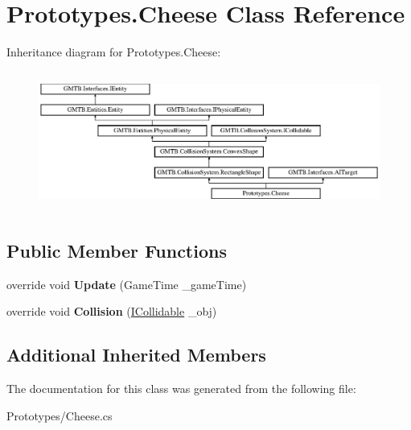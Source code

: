 \hypertarget{class_prototypes_1_1_cheese}{}\section{Prototypes.\+Cheese Class Reference}
\label{class_prototypes_1_1_cheese}
Inheritance diagram for Prototypes.\+Cheese\+:\begin{figure}[H]
\begin{center}
\leavevmode
\includegraphics[height=4.609053cm]{class_prototypes_1_1_cheese}
\end{center}
\end{figure}
\subsection*{Public Member Functions}
\begin{DoxyCompactItemize}
\item 
\mbox{\label{class_prototypes_1_1_cheese_a0683b7f62e557204538d62ba9852dc15}} 
override void {\bfseries Update} (Game\+Time \+\_\+game\+Time)
\item 
\mbox{\label{class_prototypes_1_1_cheese_a6231f1cac232ceda13cb425b066dc7d8}} 
override void {\bfseries Collision} (\mbox{\hyperlink{interface_g_m_t_b_1_1_collision_system_1_1_i_collidable}{I\+Collidable}} \+\_\+obj)
\end{DoxyCompactItemize}
\subsection*{Additional Inherited Members}


The documentation for this class was generated from the following file\+:\begin{DoxyCompactItemize}
\item 
Prototypes/Cheese.\+cs\end{DoxyCompactItemize}
